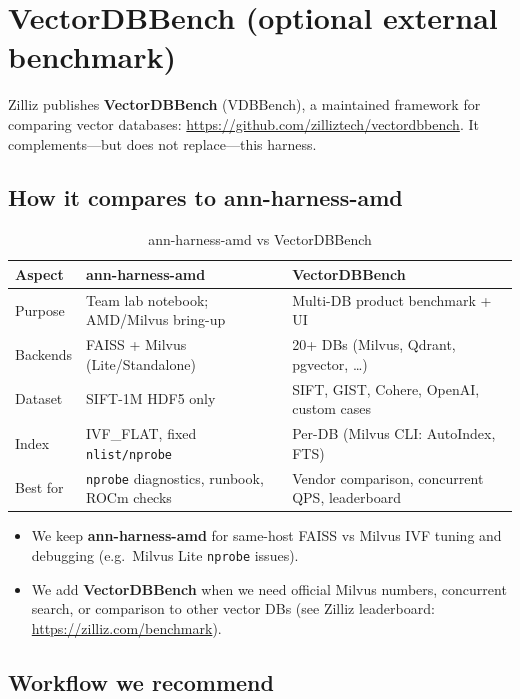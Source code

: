 \documentclass[11pt,a4paper]{article}
\begin{document}
\section{VectorDBBench (optional external benchmark)}
\label{sec:vectordbbench}

Zilliz publishes \textbf{VectorDBBench} (VDBBench), a maintained framework for comparing
vector databases: \url{https://github.com/zilliztech/vectordbbench}.
It complements---but does not replace---this harness.

\subsection{How it compares to ann-harness-amd}

\begin{table}[h]
\centering
\caption{ann-harness-amd vs VectorDBBench}
\begin{tabular}{@{}p{}p{}p{}@{}}
\toprule
\textbf{Aspect} & \textbf{ann-harness-amd} & \textbf{VectorDBBench} \\
\midrule
Purpose & Team lab notebook; AMD/Milvus bring-up & Multi-DB product benchmark + UI \\
Backends & FAISS + Milvus (Lite/Standalone) & 20+ DBs (Milvus, Qdrant, pgvector, \ldots) \\
Dataset & SIFT-1M HDF5 only & SIFT, GIST, Cohere, OpenAI, custom cases \\
Index & IVF\_FLAT, fixed \texttt{nlist/nprobe} & Per-DB (Milvus CLI: AutoIndex, FTS) \\
Best for & \texttt{nprobe} diagnostics, runbook, ROCm checks & Vendor comparison, concurrent QPS, leaderboard \\
\bottomrule
\end{tabular}
\end{table}

\begin{itemize}[leftmargin=*]
  \item We keep \textbf{ann-harness-amd} for same-host FAISS vs Milvus IVF tuning and debugging
        (e.g.\ Milvus Lite \texttt{nprobe} issues).
  \item We add \textbf{VectorDBBench} when we need official Milvus numbers, concurrent search,
        or comparison to other vector DBs (see Zilliz leaderboard:
        \url{https://zilliz.com/benchmark}).
\end{itemize}

\subsection{Workflow we recommend}
\end{document}
